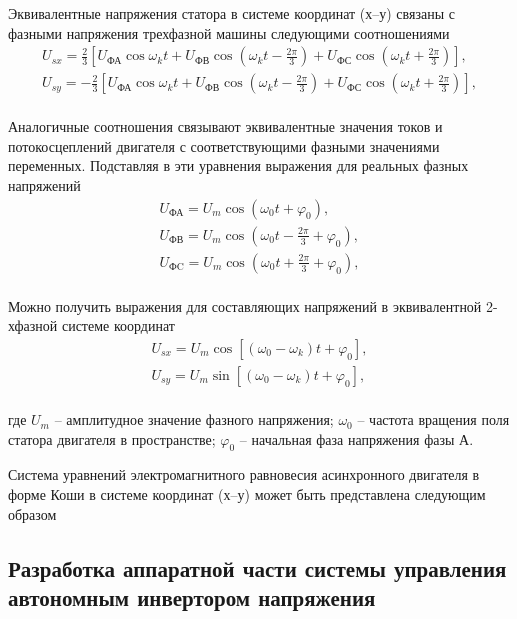         Эквивалентные напряжения статора в системе координат (х–у) связаны с
        фазными напряжения трехфазной машины следующими соотношениями
        \begin{gather*}
            U_{sx} = \frac{2}{3} \left[ U_\text{ФА}\cos\omega_k t+U_\text{ФВ}
                \cos\left(\omega_k t-\frac{2\pi}{3}\right)+U_\text{ФС} \cos
                    \left( \omega_k t+\frac{2\pi}{3}\right)\right],\\
            U_{sy} = -\frac{2}{3} \left[ U_\text{ФА}\cos\omega_k t+U_\text{ФВ}
                \cos\left(\omega_k t-\frac{2\pi}{3}\right)+U_\text{ФС} \cos
                    \left( \omega_k t+\frac{2\pi}{3}\right)\right],\\
        \end{gather*}

        Аналогичные соотношения связывают эквивалентные значения токов и
        потокосцеплений двигателя с соответствующими фазными значениями
        переменных. Подставляя в эти уравнения выражения для реальных фазных
        напряжений
        \begin{gather*}
            U_\text{ФА} = U_m\cos(\omega_0 t + \varphi_0),\\
            U_\text{ФВ} = U_m\cos\left(\omega_0t-\frac{2\pi}{3}+\varphi_0\right),\\
            U_\text{ФC} = U_m\cos\left(\omega_0t+\frac{2\pi}{3}+\varphi_0\right),\\
        \end{gather*}

        Можно получить выражения для составляющих напряжений в эквивалентной
        2-хфазной системе координат
        \begin{gather*}
            U_{sx} = U_m \cos [(\omega_0 - \omega_k)t + \varphi_0],\\
            U_{sy} = U_m \sin [(\omega_0 - \omega_k)t + \varphi_0],\\
        \end{gather*}

        где $U_m$ -- амплитудное значение фазного напряжения;
        $\omega_0$ -- частота вращения поля статора двигателя в пространстве;
        $\varphi_0$ -- начальная фаза напряжения фазы А.

        Система уравнений электромагнитного равновесия асинхронного двигателя в форме Коши в системе координат (х–у) может быть представлена следующим образом

    \subsection{Разработка аппаратной части системы управления автономным
        инвертором напряжения}

